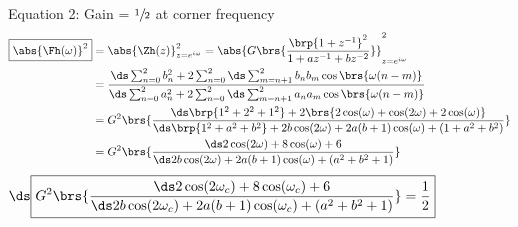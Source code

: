 Equation 2: Gain = $\sfrac{1}{2}$ at corner frequency
\begin{align*}
  \boxed{\abs{\Fh(\omega)}^2}
    &= \abs{\Zh(z)}^2_{z=e^{i\omega}}
     = \abs{G\brs{\frac{\brp{1+z^{-1}}^2}
                      {1 + az^{-1} + bz^{-2}}}}^2_{z=e^{i\omega}}
  \\&=     {\frac{\ds\sum_{n=0}^{2}b_n^2 + 2\sum_{n=0}^{2}\ds\sum_{m=n+1}^{2} b_n b_m \cos\brs{\omega(n-m)}}
                 {\ds\sum_{n=0}^{2}a_n^2 + 2\sum_{n=0}^{2}\ds\sum_{m=n+1}^{2} a_n a_m \cos\brs{\omega(n-m)}}}
  \\&=     G^2\brs{\frac{\ds\brp{1^2+2^2+1^2} + 2\brs{2\cos(\omega) + \cos(2\omega) + 2\cos(\omega)}}
                    {\ds\brp{1^2+a^2+b^2} + 2b\cos(2\omega) + 2a(b+1)\cos(\omega) + (1+a^2+b^2)}}
  \\&={G^2\brs{\frac{\ds2 \cos(2\omega) + 8\cos(\omega) + 6}
                    {\ds2b\cos(2\omega) + 2a(b+1)\cos(\omega) + (a^2+b^2+1)}}}
\end{align*}
$\ds\boxed{
  G^2\brs{\frac{\ds2 \cos(2\omega_c) + 8\cos(\omega_c) + 6}
                    {\ds2b\cos(2\omega_c) + 2a(b+1)\cos(\omega_c) + (a^2+b^2+1)}}
  = \frac{1}{2}
  }$
\vfill 


